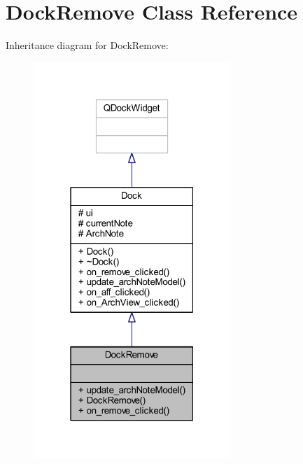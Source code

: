 \hypertarget{class_dock_remove}{}\section{Dock\+Remove Class Reference}
\label{class_dock_remove}


Inheritance diagram for Dock\+Remove\+:
\nopagebreak
\begin{figure}[H]
\begin{center}
\leavevmode
\includegraphics[width=211pt]{class_dock_remove__inherit__graph}
\end{center}
\end{figure}



